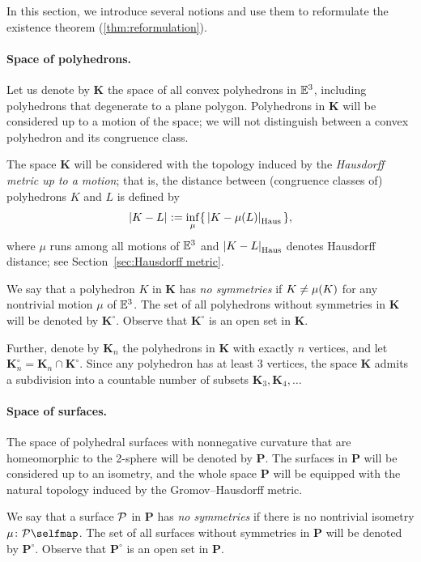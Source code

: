 In this section, we introduce several notions and use them to reformulate the existence theorem (\ref{thm:reformulation}).

\paragraph{Space of polyhedrons.}
Let us denote by $\bm{K}$ the space of all convex polyhedrons in $\mathbb{E}^3$,
including polyhedrons that degenerate to a plane polygon.
Polyhedrons in $\bm{K}$ will be considered up to a motion of the space; we will not distinguish between a convex polyhedron and its congruence class.

The space $\bm{K}$ will be considered with the topology induced by the {}\emph{Hausdorff metric up to a motion};
that is, the distance between (congruence classes of) polyhedrons $K$ and $L$ is defined by
\[\dist{K}{L}{}\df \inf_\mu \{\,\dist{K}{\mu(L)}{\Haus}\,\},\]
where $\mu$ runs among all motions of $\mathbb{E}^3$ and $\dist{K}{L}{\Haus}$ denotes Hausdorff distance; see Section~\ref{sec:Hausdorff metric}.

We say that a polyhedron $K$ in $\bm{K}$ has \emph{no symmetries} if $K\z\ne \mu(K)$ for any nontrivial motion $\mu$ of $\mathbb{E}^3$.
The set of all polyhedrons without symmetries in $\bm{K}$ will be denoted by $\bm{K}^\circ$.
Observe that $\bm{K}^\circ$ is an open set in $\bm{K}$.

Further, denote by $\bm{K}_n$ the polyhedrons in $\bm{K}$ with exactly $n$ vertices, and let $\bm{K}_n^\circ=\bm{K}_n\cap \bm{K}^\circ$.
Since any polyhedron has at least 3 vertices, the space $\bm{K}$ admits a subdivision into a countable number of subsets $\bm{K}_3,\bm{K}_4,\dots$

\paragraph{Space of surfaces.}
The space of polyhedral surfaces with nonnegative curvature that are homeomorphic to the 2-sphere will be denoted by $\bm{P}$.
The surfaces in $\bm{P}$ will be considered up to an isometry, and the whole space $\bm{P}$ will be equipped with the natural topology induced by the Gromov--Hausdorff metric.

We say that a surface $\mathcal{P}$ in $\bm{P}$ has \emph{no symmetries} if there is no nontrivial isometry
$\mu\:\spc{P}\selfmap$.
The set of all surfaces without symmetries in $\bm{P}$ will be denoted by $\bm{P}^\circ$.
Observe that $\bm{P}^\circ$ is an open set in $\bm{P}$.

